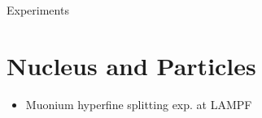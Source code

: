 Experiments

\section{Nucleus and Particles}
\begin{itemize}
    \item Muonium hyperfine splitting exp. at LAMPF
\end{itemize}
